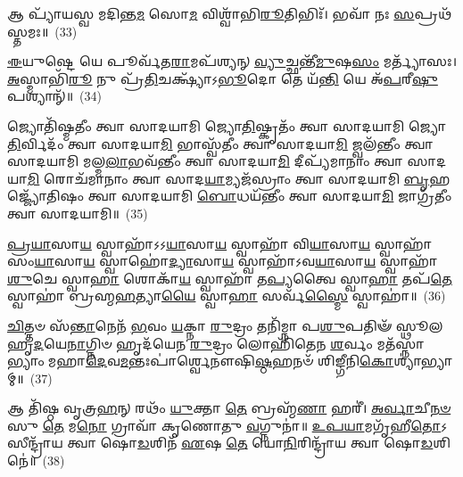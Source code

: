 {\anuvakamend[{\-\ul{𑌤}\-𑌰𑌣𑌿᳴𑌰𑍍𑌵𑌿𑍞\-\ul{𑌶}\-𑌤𑌿𑌃}]}%

𑌆 𑌪𑍍𑌯𑌾᳴𑌯𑌸𑍍𑌵 𑌮𑌦𑌿𑌨𑍍𑌤\-\ul{𑌮} 𑌸𑍋\-\ul{𑌮} 𑌵𑌿𑌶𑍍𑌵𑌾᳴𑌭𑌿\-\ul{𑌰𑍂}\-𑌤𑌿𑌭𑌿𑌃᳴। 𑌭𑌵𑌾᳴ 𑌨𑌃 \ul{𑌸}\-𑌪𑍍𑌰𑌥᳴𑌸𑍍𑌤𑌮𑌃॥~(33)

{\anuvakamend[{𑌆 𑌪𑍍𑌯𑌾᳴𑌯\-\ul{𑌸𑍍𑌵} 𑌨𑌵᳴}]}%

\-\ul{𑌈}\-𑌯𑍁𑌷𑍍𑌟𑍇 𑌯𑍇 𑌪𑍂𑌰𑍍𑌵᳴𑌤\-\ul{𑌰𑌾}\-𑌮𑌪᳴𑌶𑍍𑌯𑌨𑍍 \ul{𑌵𑍍𑌯𑍁}\-𑌚𑍍𑌛𑌨𑍍𑌤𑍀᳴\-\ul{𑌮𑍁}\-𑌷\-\ul{𑌸𑌂} 𑌮𑌰𑍍𑌤𑍍𑌯𑌾᳴𑌸𑌃। \ul{𑌅}\-𑌸𑍍𑌮𑌾𑌭𑌿᳴\-\ul{𑌰𑍂} 𑌨𑍁 𑌪𑍍𑌰᳴\-\ul{𑌤𑌿}\-𑌚𑌕𑍍𑌷𑍍𑌯𑌾᳴\-𑌽\-\ul{𑌭𑍂}\-𑌦𑍋 𑌤𑍇 𑌯᳴\-\ul{𑌨𑍍𑌤𑌿} 𑌯𑍇 𑌅᳴\-\ul{𑌪}\-𑌰𑍀\-\ul{𑌷𑍁} 𑌪𑌶𑍍𑌯𑌾𑌨𑍍᳴॥~(34)

{\anuvakamend[{\-\ul{𑌈}\-𑌯𑍁𑌰𑍇\-\ul{𑌕𑌾}\-𑌨𑍍𑌨𑌵𑌿𑍞᳴𑌶𑌤𑌿𑌃}]}%

𑌜𑍍𑌯𑍋𑌤𑌿᳴𑌷𑍍𑌮𑌤𑍀𑌂 𑌤𑍍𑌵𑌾 𑌸𑌾𑌦𑌯𑌾𑌮𑌿 𑌜𑍍𑌯𑍋\-\ul{𑌤𑌿}\-𑌷𑍍𑌕𑍃𑌤𑌂᳴ 𑌤𑍍𑌵𑌾 𑌸𑌾𑌦𑌯𑌾𑌮𑌿 𑌜𑍍𑌯𑍋\-\ul{𑌤𑌿}\-𑌰𑍍𑌵𑌿𑌦𑌂᳴ 𑌤𑍍𑌵𑌾 𑌸𑌾𑌦𑌯𑌾\-\ul{𑌮𑌿} 𑌭𑌾𑌸𑍍𑌵᳴𑌤𑍀𑌂 𑌤𑍍𑌵𑌾 𑌸𑌾𑌦𑌯𑌾\-\ul{𑌮𑌿} 𑌜𑍍𑌵𑌲᳴𑌨𑍍𑌤𑍀𑌂 𑌤𑍍𑌵𑌾 𑌸𑌾𑌦𑌯𑌾𑌮𑌿 𑌮𑌲𑍍𑌮\-\ul{𑌲𑌾}\-𑌭𑌵᳴𑌨𑍍𑌤𑍀𑌂 𑌤𑍍𑌵𑌾 𑌸𑌾𑌦𑌯𑌾\-\ul{𑌮𑌿} 𑌦𑍀𑌪𑍍𑌯᳴𑌮𑌾𑌨𑌾𑌂 𑌤𑍍𑌵𑌾 𑌸𑌾𑌦𑌯𑌾\-\ul{𑌮𑌿} 𑌰𑍋𑌚᳴𑌮𑌾𑌨𑌾𑌂 𑌤𑍍𑌵𑌾 𑌸𑌾𑌦\-\ul{𑌯𑌾}\-𑌮𑍍𑌯𑌜᳴𑌸𑍍𑌰𑌾𑌂 𑌤𑍍𑌵𑌾 𑌸𑌾𑌦𑌯𑌾𑌮𑌿 \ul{𑌬𑍃}\-𑌹𑌜𑍍𑌜𑍍𑌯𑍋᳴𑌤𑌿𑌷𑌂 𑌤𑍍𑌵𑌾 𑌸𑌾𑌦𑌯𑌾𑌮𑌿 \ul{𑌬𑍋}\-𑌧𑌯᳴𑌨𑍍𑌤𑍀𑌂 𑌤𑍍𑌵𑌾 𑌸𑌾𑌦𑌯𑌾\-\ul{𑌮𑌿} 𑌜𑌾𑌗𑍍𑌰᳴𑌤𑍀𑌂 𑌤𑍍𑌵𑌾 𑌸𑌾𑌦𑌯𑌾𑌮𑌿॥~(35)

{\anuvakamend[{𑌜𑍍𑌯𑍋𑌤𑌿᳴𑌷𑍍𑌮\-\ul{𑌤𑍀}\-\-\ul{𑍞} 𑌷𑌟𑍍𑌤𑍍𑌰𑌿𑍞᳴𑌶𑌤𑍍}]}%

\-\ul{𑌪𑍍𑌰}\-\-\ul{𑌯𑌾}\-𑌸𑌾\-\ul{𑌯} 𑌸𑍍𑌵𑌾𑌹𑌾᳴\-𑌽\-𑌽\-\ul{𑌯𑌾}\-𑌸𑌾\-\ul{𑌯} 𑌸𑍍𑌵𑌾𑌹𑌾᳴ 𑌵𑌿\-\ul{𑌯𑌾}\-𑌸𑌾\-\ul{𑌯} 𑌸𑍍𑌵𑌾𑌹𑌾᳴ 𑌸𑌂\-\ul{𑌯𑌾}\-𑌸𑌾\-\ul{𑌯} 𑌸𑍍𑌵𑌾𑌹𑍋॑\-\ul{𑌦𑍍𑌯𑌾}\-𑌸𑌾\-\ul{𑌯} 𑌸𑍍𑌵𑌾𑌹𑌾᳴\-𑌽𑌵\-\ul{𑌯𑌾}\-𑌸𑌾\-\ul{𑌯} 𑌸𑍍𑌵𑌾𑌹𑌾᳴ \ul{𑌶𑍁}\-𑌚𑍇 𑌸𑍍𑌵𑌾\-\ul{𑌹𑌾} 𑌶𑍋𑌕𑌾᳴\-\ul{𑌯} 𑌸𑍍𑌵𑌾𑌹𑌾᳴ 𑌤\-\ul{𑌪𑍍𑌯}\-𑌤𑍍𑌵𑍈 𑌸𑍍𑌵𑌾\-\ul{𑌹𑌾} 𑌤𑌪᳴\-\ul{𑌤𑍇} 𑌸𑍍𑌵𑌾𑌹𑌾॑ 𑌬𑍍𑌰𑌹𑍍𑌮\-\ul{𑌹}\-𑌤𑍍𑌯𑌾\-\ul{𑌯𑍈} 𑌸𑍍𑌵𑌾\-\ul{𑌹𑌾} 𑌸𑌰𑍍𑌵᳴\-\ul{𑌸𑍍𑌮𑍈} 𑌸𑍍𑌵𑌾𑌹𑌾॑॥~(36)

{\anuvakamend[{\-\ul{𑌪𑍍𑌰}\-\-\ul{𑌯𑌾}\-𑌸𑌾\-\ul{𑌯} 𑌚𑌤𑍁᳴𑌰𑍍𑌵𑌿𑍞𑌶𑌤𑌿𑌃}]}%

\-\ul{𑌚𑌿}\-𑌤𑍍𑌤𑍞 𑌸᳴\-\ul{𑌨𑍍𑌤𑌾}\-𑌨𑍇𑌨᳴ \ul{𑌭}\-𑌵𑌂 \ul{𑌯}\-𑌕𑍍𑌨𑌾 \ul{𑌰𑍁}\-𑌦𑍍𑌰𑌂 𑌤𑌨𑌿᳴𑌮𑍍𑌨𑌾 𑌪\-\ul{𑌶𑍁}\-𑌪𑌤𑌿𑍟᳴ 𑌸𑍍𑌥𑍂𑌲𑌹𑍃\-\ul{𑌦}\-𑌯𑍇\-\ul{𑌨𑌾}\-𑌗𑍍𑌨𑌿𑍞 𑌹𑍃𑌦᳴𑌯𑍇𑌨 \ul{𑌰𑍁}\-𑌦𑍍𑌰𑌂 𑌲𑍋𑌹𑌿᳴𑌤𑍇𑌨 \ul{𑌶}\-𑌰𑍍𑌵𑌂 𑌮𑌤᳴𑌸𑍍𑌨𑌾𑌭𑍍𑌯𑌾𑌂 𑌮𑌹𑌾\-\ul{𑌦𑍇}\-𑌵\-\ul{𑌮}\-𑌨𑍍𑌤𑌃𑌪𑌾॑𑌰𑍍𑌶𑍍𑌵𑍇𑌨𑍗𑌷𑌿\-\ul{𑌷𑍍𑌠}\-𑌹𑌨𑍞᳴ 𑌶𑌿𑌙𑍍𑌗𑍀𑌨𑌿\-\ul{𑌕𑍋}\-𑌶𑍍𑌯𑌾॑𑌭𑍍𑌯𑌾𑌮𑍍॥~(37)

{\anuvakamend[{\-\ul{𑌚𑌿}\-𑌤𑍍𑌤\-\ul{𑌮}\-𑌷𑍍𑌟𑌾𑌦᳴𑌶}]}%

𑌆 𑌤𑌿᳴𑌷𑍍𑌠 𑌵𑍃𑌤𑍍𑌰\-\ul{𑌹}\-𑌨𑍍 𑌰𑌥𑌂᳴ \ul{𑌯𑍁}\-𑌕𑍍𑌤𑌾 \ul{𑌤𑍇} 𑌬𑍍𑌰𑌹𑍍𑌮᳴\-\ul{𑌣𑌾} 𑌹𑌰𑍀॑। \ul{𑌅}\-\-\ul{𑌰𑍍𑌵𑌾}\-𑌚𑍀\-\ul{𑌨}\-\-\ul{𑍞} 𑌸𑍁 \ul{𑌤𑍇} 𑌮\-\ul{𑌨𑍋} 𑌗𑍍𑌰𑌾𑌵𑌾᳴ 𑌕𑍃𑌣𑍋𑌤𑍁 \ul{𑌵}\-𑌗𑍍𑌨𑍁𑌨𑌾॑॥ \ul{𑌉}\-\-\ul{𑌪}\-\-\ul{𑌯𑌾}\-𑌮𑌗𑍃᳴𑌹𑍀\-\ul{𑌤𑍋}\-\-𑌽𑌸𑍀𑌨𑍍𑌦𑍍𑌰𑌾᳴𑌯 𑌤𑍍𑌵𑌾 𑌷𑍋\-\ul{𑌡}\-𑌶𑌿𑌨᳴ \ul{𑌏}\-𑌷 \ul{𑌤𑍇} 𑌯𑍋\-\ul{𑌨𑌿}\-𑌰𑌿𑌨𑍍𑌦𑍍𑌰𑌾᳴𑌯 𑌤𑍍𑌵𑌾 𑌷𑍋\-\ul{𑌡}\-𑌶𑌿𑌨𑍇॑॥~(38)

